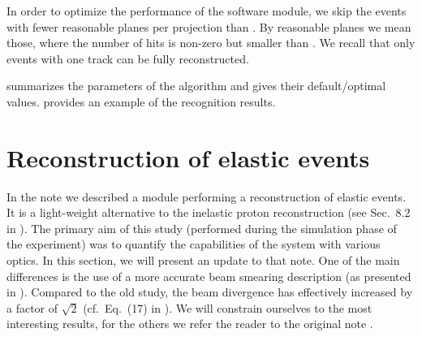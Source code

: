 
In order to optimize the performance of the software module, we skip the events with fewer reasonable planes per projection than . By reasonable planes we mean those, where the number of hits is non-zero but smaller than . We recall that only events with one track can be fully reconstructed.

 summarizes the parameters of the algorithm and gives their default/optimal values.  provides an example of the recognition results.



\section[elr]{Reconstruction of elastic events}

In the note  we described a module performing a reconstruction of elastic events. It is a light-weight alternative to the inelastic proton reconstruction (see Sec.~8.2 in ). The primary aim of this study (performed during the simulation phase of the experiment) was to quantify the capabilities of the  system with various optics. In this section, we will present an update to that note. One of the main differences is the use of a more accurate beam smearing description (as presented in ). Compared to the old study, the beam divergence has effectively increased by a factor of $\sqrt 2$ (cf.~Eq.~(17) in ). We will constrain ourselves to the most interesting results, for the others we refer the reader to the original note .

